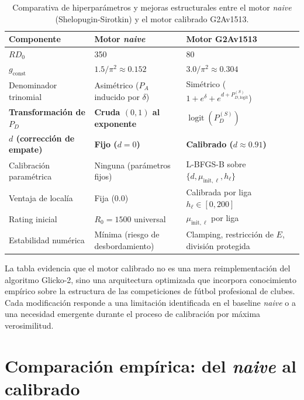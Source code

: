 \begin{table}[htbp]
	\centering
	\caption{Comparativa de hiperpar\'ametros y mejoras estructurales entre el motor \textit{naive} (Shelopugin-Sirotkin) y el motor calibrado G2Av1513.}
	\label{tab:hiperparam_comparativa_app}
	\begin{tabular}{p{3.5cm} p{4.0cm} p{4.5cm} p{3.0cm}}
		\toprule
		\textbf{Componente} & \textbf{Motor \textit{naive}} & \textbf{Motor G2Av1513}\\
		\midrule
		$RD_0$ & 350 & 80 \\
		$g_{\text{const}}$ & $1.5/\pi^2 \approx 0.152$ & $3.0/\pi^2 \approx 0.304$ \\
		Denominador trinomial & Asim\'etrico ($P_A$ inducido por $\delta$) & Sim\'etrico ($1+e^\delta+e^{d+P_{D,\text{logit}}^{(S)}}$) \\
		\textbf{Transformaci\'on de $P_D$} & \textbf{Cruda $(0,1)$ al exponente} & \textbf{$\operatorname{logit}(P_D^{(S)})$} \\
		\textbf{$d$ (correcci\'on de empate)} & \textbf{Fijo ($d=0$)} & \textbf{Calibrado ($d\approx 0.91$)} \\
		Calibraci\'on param\'etrica & Ninguna (par\'ametros fijos) & L-BFGS-B sobre $\{d, \mu_{\text{init},\ell}, h_\ell\}$ \\
		Ventaja de local\'ia & Fija (0.0) & Calibrada por liga $h_\ell \in [0,200]$ \\
		Rating inicial & $R_0 = 1500$ universal & $\mu_{\text{init},\ell}$ por liga \\
		Estabilidad num\'erica & M\'inima (riesgo de desbordamiento) & Clamping, restricci\'on de $E$, divisi\'on protegida \\
		\bottomrule
	\end{tabular}
\end{table}

La tabla evidencia que el motor calibrado no es una mera reimplementaci\'on del algoritmo Glicko-2, sino una arquitectura optimizada que incorpora conocimiento emp\'irico sobre la estructura de las competiciones de f\'utbol profesional de clubes. Cada modificaci\'on responde a una limitaci\'on identificada en el baseline \textit{naive} o a una necesidad emergente durante el proceso de calibraci\'on por m\'axima verosimilitud.


\section{Comparaci\'on emp\'irica: del \textit{naive} al calibrado}

